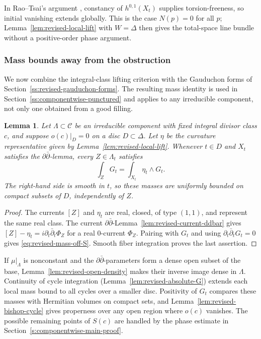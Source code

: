\documentclass[11pt]{amsart}
\numberwithin{equation}{section}
\theoremstyle{plain}
\newtheorem{lemma}[thm]{Lemma}
\theoremstyle{definition}
\begin{document}
In Rao--Tsai's argument \cite[Propositions~4.12 and~4.13]{RT21},
constancy of $h^{0,1}(X_t)$ supplies torsion-freeness, so initial
vanishing extends globally.  This is the case $N(p)=0$ for all $p$;
Lemma~\ref{lem:revised-local-lift} with $W=\Delta$ then gives the
total-space line bundle without a positive-order phase argument.
\subsubsection{Mass bounds away from the obstruction}
We now combine the integral-class lifting criterion with the Gauduchon
forms of Section~\ref{ss:revised-gauduchon-forms}.  The resulting mass
identity is used in Section~\ref{ss:componentwise-punctured} and applies
to any irreducible component, not only one obtained from a good filling.

\begin{lemma}\label{lem:revised-mass-off-S}
Let $\Lambda\subset\mathscr C$ be an irreducible component with fixed
integral divisor class $c$, and suppose $o(c)|_D=0$ on a disc
$D\subset\Delta$.  Let $\eta$ be the curvature representative given
by Lemma~\ref{lem:revised-local-lift}.  Whenever $t\in D$ and $X_t$ satisfies
the $\partial\bar\partial$-lemma, every $Z\in\Lambda_t$ satisfies
\begin{equation}\label{eq:revised-mass-off-S}
 \int_ZG_t=\int_{X_t}\eta_t\wedge G_t.
\end{equation}
The right-hand side is smooth in $t$, so these masses are uniformly
bounded on compact subsets of $D$, independently of $Z$.
\end{lemma}

\begin{proof}
The currents $[Z]$ and $\eta_t$ are real, closed, of type $(1,1)$,
and represent the same real class.  The current
$\partial\bar\partial$-Lemma~\ref{lem:revised-current-ddbar} gives
$[Z]-\eta_t=i\partial_t\bar\partial_t\Phi_Z$ for a real $0$-current
$\Phi_Z$.  Pairing with $G_t$ and using
$\partial_t\bar\partial_tG_t=0$ gives \eqref{eq:revised-mass-off-S}.
Smooth fiber integration proves the last assertion.
\end{proof}

If $\mu|_\Lambda$ is nonconstant and the
$\partial\bar\partial$-parameters form a dense open subset of the
base, Lemma~\ref{lem:revised-open-density} makes their inverse image dense in
$\Lambda$.  Continuity of cycle integration
(Lemma~\ref{lem:revised-absolute-G}) extends each local mass bound to all
cycles over a smaller disc.  Positivity of $G_t$ compares these masses
with Hermitian volumes on compact sets, and
Lemma~\ref{lem:revised-bishop-cycle} gives properness over any open region
where $o(c)$ vanishes.  The possible remaining points of $S(c)$ are
handled by the phase estimate in
Section~\ref{s:componentwise-main-proof}.
\end{document}
